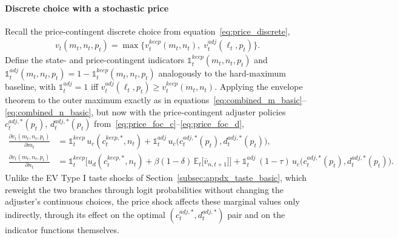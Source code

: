 \paragraph{Discrete choice with a stochastic price}
Recall the price-contingent discrete choice from equation~\eqref{eq:price_discrete},
\begin{align}
	v_t(m_t,n_t,p_t) = \max\Big\{v_t^{keep}(m_t,n_t),\; v_t^{adj}(\ell_t,p_t)\Big\}.
\end{align}
Define the state- and price-contingent indicators $\mathbb{1}_t^{keep}(m_t,n_t,p_t)$ and $\mathbb{1}_t^{adj}(m_t,n_t,p_t)=1-\mathbb{1}_t^{keep}(m_t,n_t,p_t)$ analogously to the hard-maximum baseline, with $\mathbb{1}_t^{adj}=1$ iff $v_t^{adj}(\ell_t,p_t)\ge v_t^{keep}(m_t,n_t)$. Applying the envelope theorem to the outer maximum exactly as in equations~\eqref{eq:combined_m_basic}--\eqref{eq:combined_n_basic}, but now with the price-contingent adjuster policies $c_t^{adj,\ast}(p_t)$, $d_t^{adj,\ast}(p_t)$ from~\eqref{eq:price_foc_c}--\eqref{eq:price_foc_d},
\begin{align}
	\frac{\partial v_t(m_t,n_t,p_t)}{\partial m_t}
	&= \mathbb{1}_t^{keep}\, u_c(c_t^{keep,\ast},n_t) + \mathbb{1}_t^{adj}\, u_c\big(c_t^{adj,\ast}(p_t),d_t^{adj,\ast}(p_t)\big), \label{eq:price_vm}\\
	\frac{\partial v_t(m_t,n_t,p_t)}{\partial n_t}
	&= \mathbb{1}_t^{keep}\Big[u_d(c_t^{keep,\ast},n_t) + \beta(1-\delta)\,\mathbb{E}_t\big[\bar v_{n,t+1}\big]\Big]
	+ \mathbb{1}_t^{adj}\,(1-\tau)\, u_c\big(c_t^{adj,\ast}(p_t),d_t^{adj,\ast}(p_t)\big). \label{eq:price_vn}
\end{align}
Unlike the EV Type I taste shocks of Section~\ref{subsec:appdx_taste_basic}, which reweight the two branches through logit probabilities without changing the adjuster's continuous choices, the price shock affects these marginal values only indirectly, through its effect on the optimal $(c_t^{adj,\ast},d_t^{adj,\ast})$ pair and on the indicator functions themselves.

